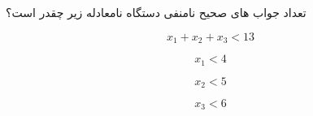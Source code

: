 \exercise
تعداد جواب های صحیح نامنفی دستگاه نامعادله زیر چقدر است؟

$$x_1 + x_2 + x_3 < 13$$

$$x_1 < 4$$

$$x_2 < 5$$

$$x_3 < 6$$
